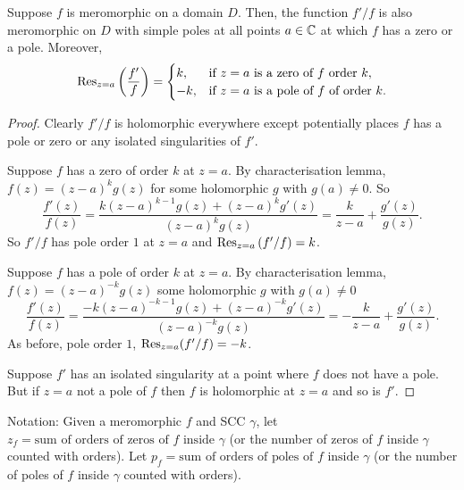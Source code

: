 \documentclass[10pt, a4paper]{article}
\begin{document}
\begin{lemma}
    Suppose $f$ is meromorphic on a domain $D$.
    Then,
    the function $f' / f$ is also meromorphic on $D$ with simple poles at all points $a \in \mathbb{C}$ at which $f$ has a zero or a  pole.
    Moreover,
    \[
    \operatorname{Res}_{z = a}\left(\frac{f'}{f}\right) = \begin{cases}
        k, &\text{if $z = a$ is a zero of $f$ order $k$}, \\
        -k, &\text{if $z = a$ is a pole of $f$ of order $k$}.
    \end{cases}
    \]

    \begin{proof}
        Clearly $f' / f$ is holomorphic everywhere except potentially places $f$ has a pole or zero or any isolated singularities of $f'$.

        Suppose $f$ has a zero of order $k$ at $z = a$.
        By characterisation lemma,
        $f(z) = (z - a) ^ kg(z)$ for some holomorphic $g$ with $g(a) \neq 0$.
        So
        \[
        \frac{f'(z)}{f(z)} = \frac{k(z - a) ^ {k - 1}g(z) + (z - a) ^ kg'(z)}{(z - a) ^ kg(z)} = \frac{k}{z - a} + \frac{g'(z)}{g(z)}.
        \]
        So $f' / f$ has pole order $1$ at $z = a$ and $\operatorname{Res}_{z = a}\left(f' / f\right) = k$.

        Suppose $f$ has a pole of order $k$ at $z = a$.
        By characterisation lemma,
        $f(z) = (z - a) ^ {-k}g(z)$ some holomorphic $g$ with $g(a) \neq 0$
        \[
        \frac{f'(z)}{f(z)} = \frac{-k(z - a) ^ {-k - 1}g(z) + (z - a) ^ {-k}g'(z)}{(z - a) ^ {-k}g(z)} = -\frac{k}{z - a}  + \frac{g'(z)}{g(z)}.
        \]
        As before,
        pole order $1$,
        $\operatorname{Res}_{z = a}(f' / f) = -k$.

        Suppose $f'$ has an isolated singularity at a point where $f$ does not have a pole.
        But if $z = a$ not a pole of $f$ then $f$ is holomorphic at $z = a$ and so is $f'$.
    \end{proof}
\end{lemma}

Notation:
Given a meromorphic $f$ and SCC $\gamma$,
let $z_f = \text{sum of orders of zeros of $f$ inside $\gamma$}$
(or the number of zeros of $f$ inside $\gamma$ counted with orders).
Let $p_f = \text{sum of orders of poles of $f$ inside $\gamma$}$
(or the number of poles of $f$ inside $\gamma$ counted with orders).
\end{document}
